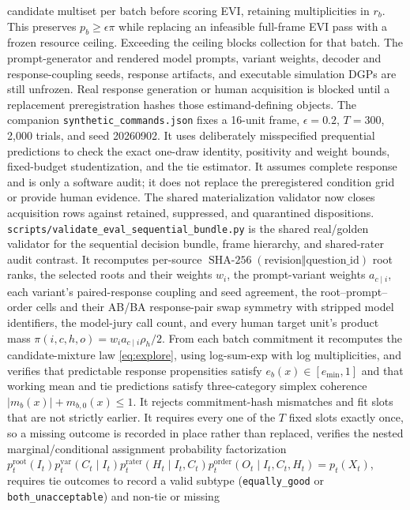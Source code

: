 \documentclass{article}
\begin{document}
candidate multiset per batch before scoring EVI, retaining multiplicities in
$r_b$. This preserves $p_b\ge\epsilon\pi$ while replacing an infeasible
full-frame EVI pass with a frozen resource ceiling. Exceeding the ceiling
blocks collection for that batch.
The prompt-generator and rendered model prompts, variant weights, decoder and
response-coupling seeds, response artifacts, and executable simulation DGPs
are still unfrozen. Real response generation or human acquisition is blocked
until a replacement preregistration hashes those estimand-defining objects.
The companion \texttt{synthetic\_commands.json} fixes a 16-unit frame,
$\epsilon=0.2$, $T=300$, 2,000 trials, and seed 20260902. It uses deliberately
misspecified prequential predictions to check the exact one-draw identity,
positivity and weight bounds, fixed-budget studentization, and the tie
estimator. It assumes complete response and is only a software audit; it does
not replace the preregistered condition grid or provide human evidence.
The shared materialization validator now closes acquisition rows against
retained, suppressed, and quarantined dispositions.
\texttt{scripts/validate\_eval\_sequential\_bundle.py} is the shared
real/golden validator for the sequential decision bundle, frame hierarchy, and
shared-rater audit contrast.
It recomputes per-source $\operatorname{SHA-256}(\text{revision}\Vert
\text{question\_id})$ root ranks, the selected roots and their weights $w_i$,
the prompt-variant weights $a_{c\mid i}$, each variant's paired-response
coupling and seed agreement, the root--prompt--order cells and their AB/BA
response-pair swap symmetry with stripped model identifiers, the
model-jury call count, and every human target unit's product mass
$\pi(i,c,h,o)=w_ia_{c\mid i}\rho_h/2$. From each batch
commitment it recomputes the candidate-mixture law \cref{eq:explore}, using
log-sum-exp with log multiplicities, and verifies that predictable response
propensities satisfy $e_b(x)\in[e_{\min},1]$ and that working mean and tie
predictions satisfy three-category simplex coherence
$|m_b(x)|+m_{b,0}(x)\le1$. It rejects commitment-hash mismatches and
fit slots that are not strictly earlier. It requires every one of the $T$
fixed slots exactly once, so a missing outcome is recorded in place rather
than replaced, verifies the nested marginal/conditional assignment probability
factorization
$p_t^{\mathrm{root}}(I_t)p_t^{\mathrm{var}}(C_t\mid I_t)
p_t^{\mathrm{rater}}(H_t\mid I_t,C_t)
p_t^{\mathrm{order}}(O_t\mid I_t,C_t,H_t)=p_t(X_t)$, requires tie outcomes to record a valid subtype
(\texttt{equally\_good} or \texttt{both\_unacceptable}) and non-tie or missing
\end{document}
